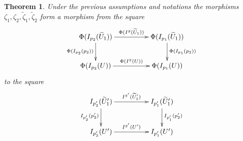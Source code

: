 \documentclass[12pt]{article}
\numberwithin{equation}{section}
\newtheorem{theorem}[proposition]{Theorem}
\newcommand{\llabel}[1]{\label{#1}}
\newcommand{\wt}{\widetilde}
\begin{document}
%
\begin{theorem}
\llabel{2015.04.10.th3} Under the previous assumptions and notations the
morphisms $\zeta_1,\zeta_2,\wt{\zeta}_1,\wt{\zeta}_2$ form a morphism from the
square
%
$$
\begin{xy}
          \xymatrix@C=4pc{ \Phi(I_{p_2}(\wt{U}_1))
            \ar[r]^-{\Phi(I^g(\wt{U}_1))} \ar[d]_{\Phi(I_{p_2}(p_2))} &
            \Phi(I_{p_1}(\wt{U}_1))
            \ar[d]^{\Phi(I_{p_1}(p_2))}\\ \Phi(I_{p_2}(U))
            \ar[r]^{\Phi(I^g(U))} & \Phi(I_{p_1}(U)) }
\end{xy}
$$
%
to the square
%
$$
\begin{xy}
          \xymatrix@C=4pc{
                 I_{p_2'}(\wt{U}_1')   \ar[r]^-{I^{g'}(\wt{U}_1')} \ar[d]_{I_{p_2'}(p_2')} & 
                 I_{p_1'}(\wt{U}_1') \ar[d]^{I_{p_1'}(p_2')}\\
		I_{p_2'}(U')   \ar[r]^{I^{g'}(U')} &
		I_{p_1'}(U')
                }
\end{xy}
$$
%
\end{theorem}
%
\end{document}
